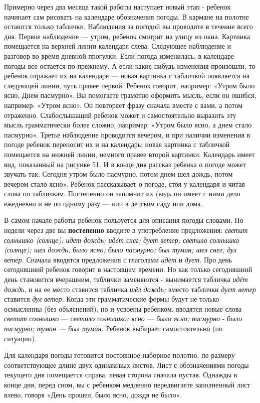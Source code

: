 \documentclass[a5paper]{book}
\renewcommand{\emph}[1]{\textit{#1}}
\begin{document}
Примерно через два месяца такой работы наступает новый этап - ребенок
начинает сам рисовать на календаре обозначения погоды. В кармане на
полотне остаются только таблички. Наблюдения за погодой вы проводите в
течение всего дня. Первое наблюдение --- утром, ребенок смотрит на улицу
из окна. Картинка помещается на верхней линии календаря слева. Следующее
наблюдение и разговор во время дневной прогулки. Если погода изменилась,
в календаре погоды все остается по-прежнему. А если какие-нибудь
изменения произошли, то ребенок отражает их на календаре --- новая
картинка с табличкой появляется на следующей линии, чуть правее первой.
Ребенок говорит, например: «Утром было ясно. Днем пасмурно». Вы
помогаете грамотно оформить мысль, если он ошибся, например: «Утром
ясно». Он повторяет фразу сначала вместе с вами, а потом отраженно.
Слабослышащий ребенок может и самостоятельно выразить эту мысль
грамматически более сложно, например: «Утром было ясно, а днем стало
пасмурно». Третье наблюдение проводится вечером, и при наличии изменения
в погоде ребенок переносит их и на календарь: новая картинка с табличкой
помещается на нижней линии, немного правее второй картинки. Календарь
имеет вид, показанный на рисунке 51. И в конце дня рассказ ребенка о
погоде может звучать так: Сегодня утром было пасмурно, потом днем шел
дождь, потом вечером стало ясно». Ребенок рассказывает о погоде, стоя у
календаря и читая слова по табличкам. Постепенно он запомнит их (ведь он
имеет с ними дело ежедневно и не по одному разу --- или в детском саду
или дома.

В самом начале работы ребенок пользуется для описания погоды словами. Но
недели через две вы \textbf{постепенно} вводите в употребление
предложения: \emph{светит солнышко (солнце); идет дождь; идёт снег; дует
ветер; светило солнышко (солнце); шел дождь, было ясно; было пасмурно;
был туман; шел снег; дул ветер.} Сначала вводятся предложения с
глаголами \emph{идет} и \emph{дует.} Про день сегодняшний ребенок
говорит в настоящем времени. Но как только сегодняшний день становится
вчерашним, таблички заменяются - вынимается табличка \emph{идёт дождь,}
и на ее место ставится табличка \emph{шёл дождь;} вместо таблички
\emph{дует ветер} ставится \emph{дул} \emph{ветер.} Когда эти
грамматические формы будут не только осмысленны (без объяснений), но и
усвоены ребенком, вводятся новые слова \emph{светит солнышко} ---
\emph{светило солнышко; ясно} --- \emph{было ясно; пасмурно} -
\emph{было пасмурно; туман --- был туман.} Ребенок выбирает
самостоятельно (по ситуации).

Для календаря погоды готовится постоянное наборное полотно, по размеру
соответствующее длине двух одинаковых листов. Лист с обозначениями
погоды текущего дня помещается справа, левая сторона сначала пустая.
Однажды в конце дня, перед сном, вы с ребенком медленно передвигаете
заполненный лист влево, говоря «День прошел, было ясно, дождя не было».
\end{document}
